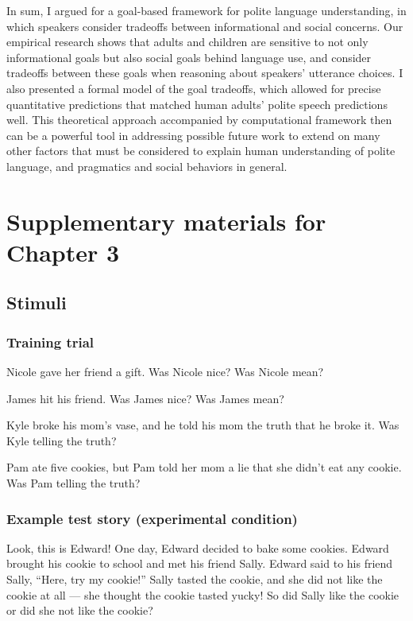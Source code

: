 \documentclass[oneside]{report}
\begin{document}
In sum, I argued for a goal-based framework for polite language
understanding, in which speakers consider tradeoffs between
informational and social concerns. Our empirical research shows that
adults and children are sensitive to not only informational goals but
also social goals behind language use, and consider tradeoffs between
these goals when reasoning about speakers' utterance choices. I also
presented a formal model of the goal tradeoffs, which allowed for
precise quantitative predictions that matched human adults' polite
speech predictions well. This theoretical approach accompanied by
computational framework then can be a powerful tool in addressing
possible future work to extend on many other factors that must be
considered to explain human understanding of polite language, and
pragmatics and social behaviors in general.

\appendix

\chapter{Supplementary materials for Chapter
3}\label{supplementary-materials-for-chapter-3}

\section{Stimuli}\label{stimuli-1}

\subsection{Training trial}\label{training-trial}

Nicole gave her friend a gift. Was Nicole nice? Was Nicole mean?

James hit his friend. Was James nice? Was James mean?

Kyle broke his mom's vase, and he told his mom the truth that he broke
it. Was Kyle telling the truth?

Pam ate five cookies, but Pam told her mom a lie that she didn't eat any
cookie. Was Pam telling the truth?

\subsection{Example test story (experimental
condition)}\label{example-test-story-experimental-condition}

Look, this is Edward! One day, Edward decided to bake some cookies.
Edward brought his cookie to school and met his friend Sally. Edward
said to his friend Sally, ``Here, try my cookie!'' Sally tasted the
cookie, and she did not like the cookie at all --- she thought the
cookie tasted yucky! So did Sally like the cookie or did she not like
the cookie?
\end{document}
